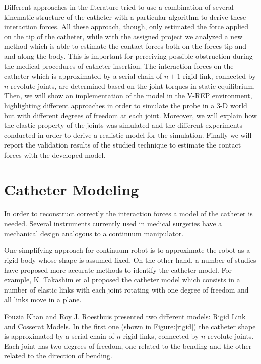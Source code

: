 \documentclass[conference,12pt]{IEEEtran}
\begin{document}
Different approaches in the literature tried to use a combination of several kinematic structure of the catheter with a particular algorithm to derive these interaction forces. All these approach, though, only estimated the force applied on the tip of the catheter, while with the assigned project we analyzed a new method which is able to estimate the contact forces both on the forces tip and and along the body. This is important for perceiving possible obstruction during the medical procedures of catheter insertion. The interaction forces on the catheter which is approximated by a serial chain of $n+1$ rigid link, connected by $n$ revolute joints, are determined based on the joint torques in static equilibrium. Then, we will show an implementation of the model in the V-REP environment, highlighting different approaches in order to simulate the probe in a 3-D world but with different degrees of freedom at each joint. Moreover, we will explain how the elastic property of the joints was simulated and the different experiments conducted in order to derive a realistic model for the simulation. Finally we will report the validation results of the studied technique to estimate the contact forces with the developed model.

\section{Catheter Modeling}

In order to reconstruct correctly the interaction forces a model of the catheter is needed. Several instruments currently used in medical surgeries have a mechanical design analogous to a continuum manipulator.

One simplifying approach for continuum robot is to approximate the robot as a rigid body whose shape is assumed fixed. On the other hand, a number of studies have proposed more accurate methods to identify the catheter model. For example, K. Takashim et al \cite{takashima} proposed the catheter model which consists in a number of elastic links with each joint rotating with one degree of freedom and all links move in a plane. 

Fouzia Khan and Roy J. Roesthuis \cite{khan} presented two different models: Rigid Link and Cosserat Models. In the first one (shown in Figure:\ref{rigid}) the catheter shape is approximated by a serial chain of $n$ rigid links, connected by $n$ revolute joints. Each joint has two degrees of freedom, one related to the bending and the other related to the direction of bending.
\end{document}
